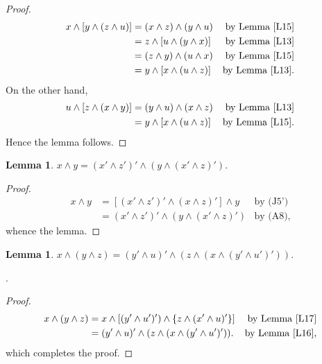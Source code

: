 \documentclass{amsart}
\theoremstyle{plain}
\newtheorem{lemma}[theorem]{Lemma}
\theoremstyle{problem}
\theoremstyle{definition}
\theoremstyle{remark}
\numberwithin{equation}{section}
\begin{document}
\begin{proof}
\begin{align*}
x \land [y \land (z \land u)]  &=  (x \land z) \land (y \land u) &\text{by Lemma \ref{L15}}\\ 
                                           &= z \land [u \land (y \land x)] &\text{by Lemma \ref{L13}}\\    
                                           &= (z \land y) \land (u  \land  x) &\text{by Lemma \ref{L15}}\\ 
                                           &= y \land [x \land (u \land z)] &\text{by Lemma \ref{L13}}.
\end{align*}
 On the other hand,
\begin{align*} 
u \land [z \land (x \land y)] &= (y \land u) \land (x \land z) &\text{by Lemma \ref{L13}}\\ 
                                           &= y \land [x \land (u \land z)] &\text{by Lemma \ref{L15}}.
\end{align*}
Hence the lemma follows.
\end{proof}


\begin{lemma} \label{L17} 
 $ x \land y = (x' \land z')' \land (y \land (x' \land z)').$  
\end{lemma}

\begin{proof}
\begin{align*}
x \land y &= [ (x' \land z')' \land (x \land z)'] \land y  &\text{by (J5')} \\
               &= (x' \land z')' \land (y \land (x' \land z)')  &\text{by (A8)},
\end{align*}
whence the lemma.
\end{proof}

\begin{lemma} \label{L18} 
 $x \land (y \land z) = (y' \land u)' \land (z \land  (x \land  (y' \land  u')')).$  
\end{lemma}

.
\begin{proof}
\begin{align*}
x \land (y \land z)  &=  x \land [(y' \land u')') \land \{z \land (x' \land u)'\}]  &\text{by Lemma \ref{L17}} \\                                    &= (y' \land u)' \land (z \land (x \land  (y' \land  u')')).  &\text{by Lemma \ref{L16}}, 
\end{align*}
which completes the proof.
\end{proof}
\end{document}
